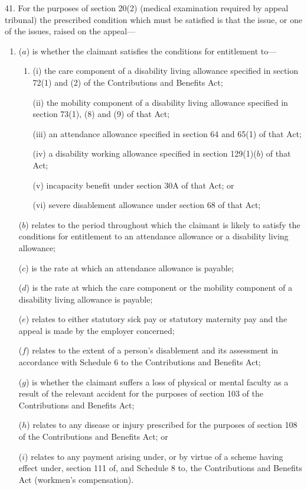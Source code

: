 \documentclass[12pt,a4paper]{article}
\begin{document}
41.  For the purposes of section 20(2) (medical examination required by appeal tribunal) the prescribed condition which must be satisfied is that the issue, or one of the issues, raised on the appeal—
\begin{enumerate}\item[]
($a$) is whether the claimant satisfies the conditions for entitlement to—
\begin{enumerate}\item[]
(i) the care component of a disability living allowance specified in section 72(1) and (2) of the Contributions and Benefits Act;

(ii) the mobility component of a disability living allowance specified in section 73(1), (8) and (9) of that Act;

(iii) an attendance allowance specified in section 64 and 65(1) of that Act;

(iv) a disability working allowance specified in section 129(1)($b$) of that Act;

(v) incapacity benefit under section 30A of that Act; or

(vi) severe disablement allowance under section 68 of that Act;
\end{enumerate}

($b$) relates to the period throughout which the claimant is likely to satisfy the conditions for entitlement to an attendance allowance or a disability living allowance;

($c$) is the rate at which an attendance allowance is payable;

($d$) is the rate at which the care component or the mobility component of a disability living allowance is payable;

($e$) relates to either statutory sick pay or statutory maternity pay and the appeal is made by the employer concerned;

($f$) relates to the extent of a person’s disablement and its assessment in accordance with Schedule 6 to the Contributions and Benefits Act;

($g$) is whether the claimant suffers a loss of physical or mental faculty as a result of the relevant accident for the purposes of section 103 of the Contributions and Benefits Act;

($h$) relates to any disease or injury prescribed for the purposes of section 108 of the Contributions and Benefits Act; or

($i$) relates to any payment arising under, or by virtue of a scheme having effect under, section 111 of, and Schedule 8 to, the Contributions and Benefits Act (workmen’s compensation).
\end{enumerate}
\end{document}
